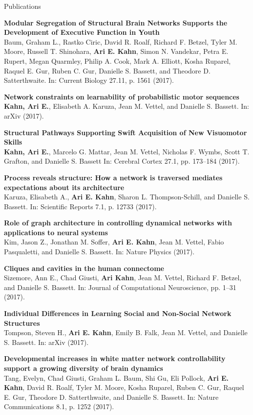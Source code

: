 \documentclass{resume} %
\begin{document}
\begin{rSection}{Publications}


\textbf{Modular Segregation of Structural Brain Networks Supports the Development of Executive Function in Youth} \\
Baum, Graham L., Rastko Ciric, David R. Roalf, Richard F. Betzel, Tyler M. Moore, Russell T. Shinohara, \textbf{Ari E. Kahn}, Simon N. Vandekar, Petra E. Rupert, Megan Quarmley, Philip A. Cook, Mark A. Elliott, Kosha Ruparel, Raquel E. Gur, Ruben C. Gur, Danielle S. Bassett, and Theodore D. Satterthwaite. In: Current Biology 27.11, p. 1561 (2017).

\textbf{Network constraints on learnability of probabilistic motor sequences} \\
\textbf{Kahn, Ari E.}, Elisabeth A. Karuza, Jean M. Vettel, and Danielle S. Bassett. In: arXiv (2017).

\textbf{Structural Pathways Supporting Swift Acquisition of New Visuomotor Skills} \\
\textbf{Kahn, Ari E.}, Marcelo G. Mattar, Jean M. Vettel, Nicholas F. Wymbs, Scott T. Grafton, and Danielle S. Bassett In: Cerebral Cortex 27.1, pp. 173–184 (2017).

\textbf{Process reveals structure: How a network is traversed mediates expectations about its architecture} \\
Karuza, Elisabeth A., \textbf{Ari E. Kahn}, Sharon L. Thompson-Schill, and Danielle S. Bassett. In: Scientific Reports 7.1, p. 12733 (2017).

\textbf{Role of graph architecture in controlling dynamical networks with applications to neural systems} \\
Kim, Jason Z., Jonathan M. Soffer, \textbf{Ari E. Kahn}, Jean M. Vettel, Fabio Pasqualetti, and Danielle S. Bassett. In: Nature Physics (2017).

\textbf{Cliques and cavities in the human connectome} \\
Sizemore, Ann E., Chad Giusti, \textbf{Ari Kahn}, Jean M. Vettel, Richard F. Betzel, and Danielle S. Bassett. In: Journal of Computational Neuroscience, pp. 1–31 (2017).

\textbf{Individual Differences in Learning Social and Non-Social Network Structures} \\
Tompson, Steven H., \textbf{Ari E. Kahn}, Emily B. Falk, Jean M. Vettel, and Danielle S. Bassett. In: arXiv (2017).

\textbf{Developmental increases in white matter network controllability support a growing diversity of brain dynamics} \\
Tang, Evelyn, Chad Giusti, Graham L. Baum, Shi Gu, Eli Pollock, \textbf{Ari E. Kahn}, David R. Roalf, Tyler M. Moore, Kosha Ruparel, Ruben C. Gur, Raquel E. Gur, Theodore D. Satterthwaite, and Danielle S. Bassett. In: Nature Communications 8.1, p. 1252 (2017).


\end{rSection}
\end{document}
